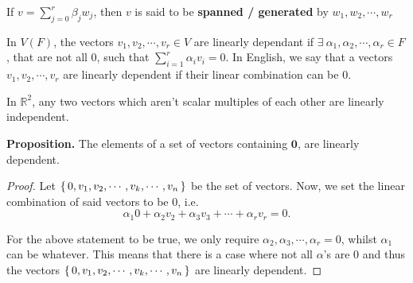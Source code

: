 



\begin{definition}
    If $v = \displaystyle\sum_{j=0}^r \beta_j w_j$, then $v$ is said to be \textbf{spanned /
    generated} by $w_1, w_2, \cdots, w_r$
\end{definition}

\begin{definition}
    In $V(F)$, the vectors $v_1, v_2, \cdots, v_r \in V$ are linearly dependant if
    $\exists\ \alpha_1, \alpha_2, \cdots, \alpha_r \in F$, that are
    not all 0, such that $\sum_{i=1}^r \alpha_i v_i = 0$. In English,
    we say that a vectors $v_1, v_2, \cdots, v_r$ are linearly dependent if their
    linear combination can be 0.
\end{definition}

\begin{note}
  In $\mathbb{R}^{2}$, any two vectors which aren't scalar multiples of each other
  are linearly independent.
\end{note}

\textbf{Proposition.} 
    The elements of a set of vectors containing $\mathbf{0}$, are linearly dependent.

\begin{proof}
  Let $\set{0, v_{1}, v_{2}, \cdots, v_{k}, \cdots, v_{n}}$ be the set of
  vectors. Now, we set the linear combination of said vectors to be 0, i.e. 
  \[\alpha_1 0 + \alpha_2 v_{2} + \alpha_3 v_{3} + \cdots + \alpha_r v_r = 0.\] 

  For the above statement to be true, we only require $\alpha_2, \alpha_3, \cdots,
  \alpha_r = 0$, whilst $\alpha_1$ can be whatever. This means that there is a case
  where not all $\alpha$'s are 0 and thus the vectors  $\set{0, v_{1}, v_{2}, \cdots,
  v_{k}, \cdots, v_{n}}$ are linearly dependent.
\end{proof}
